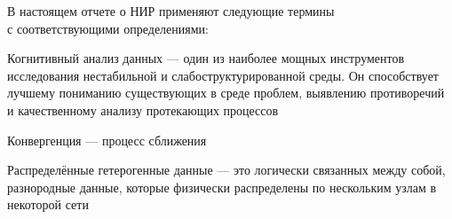 В настоящем отчете о НИР применяют следующие термины\\с соответствующими определениями:

\noindent Когнитивный анализ данных --- один из наиболее мощных инструментов исследования нестабильной и слабоструктурированной среды. Он способствует лучшему пониманию существующих в среде проблем, выявлению противоречий и качественному анализу протекающих процессов

\noindent Конвергенция --- процесс сближения

\noindent Распределённые гетерогенные данные --- это логически связанных между собой, разнородные данные, которые физически распределены по нескольким узлам в некоторой сети


\pagebreak